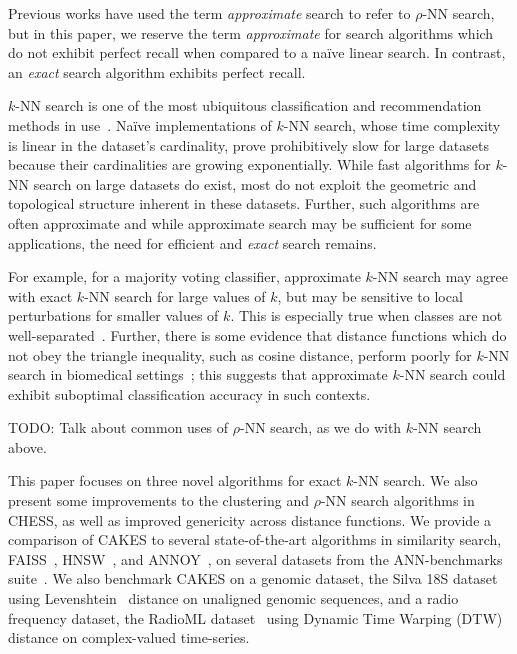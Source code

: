 Previous works have used the term \emph{approximate} search to refer to $\rho$-NN search, but in this paper, we reserve the term \emph{approximate} for search algorithms which do not exhibit perfect recall when compared to a na\"{i}ve linear search.
In contrast, an \emph{exact} search algorithm exhibits perfect recall.

$k$-NN search is one of the most ubiquitous classification and recommendation methods in use~\cite{fix1952discriminatory, cover1967nearest}.
Na\"{i}ve implementations of $k$-NN search, whose time complexity is linear in the dataset's cardinality, prove prohibitively slow for large datasets because their cardinalities are growing exponentially.
While fast algorithms for $k$-NN search on large datasets do exist, most do not exploit the geometric and topological structure inherent in these datasets.
Further, such algorithms are often approximate and while approximate search may be sufficient for some applications, the need for efficient and \emph{exact} search remains.

For example, for a majority voting classifier, approximate $k$-NN search may agree with exact $k$-NN search for large values of $k$, but may be sensitive to local perturbations for smaller values of $k$.
This is especially true when classes are not well-separated~\cite{zhang2022imbalanced}.
Further, there is some evidence that distance functions which do not obey the triangle inequality, such as cosine distance, perform poorly for $k$-NN search in biomedical settings~\cite{hu2016distance};
this suggests that approximate $k$-NN search could exhibit suboptimal classification accuracy in such contexts.

{\color{red} TODO: Talk about common uses of $\rho$-NN search, as we do with $k$-NN search above.}

This paper focuses on three novel algorithms for exact $k$-NN search.
We also present some improvements to the clustering and $\rho$-NN search algorithms in CHESS, as well as improved genericity across distance functions.
We provide a comparison of CAKES to several state-of-the-art algorithms in similarity search, FAISS~\cite{johnson2019billion}, HNSW~\cite{malkov2016hnsw}, and ANNOY~\cite{annoy}, on several datasets from the ANN-benchmarks suite~\cite{aumuller2020ann}.
We also benchmark CAKES on a genomic dataset, the Silva 18S dataset~\cite{10.1093/nar/gks1219} using Levenshtein~\cite{levenshtein1966binary} distance on unaligned genomic sequences, and a radio frequency dataset, the RadioML dataset~\cite{oshea2018radioml} using Dynamic Time Warping (DTW)~\cite{gold2018dynamic} distance on complex-valued time-series.


